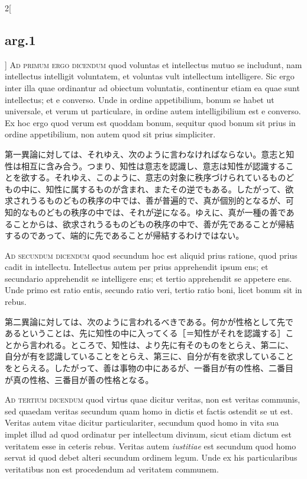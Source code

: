 \documentclass[paper=a4paper,fontsize=10pt,jafontsize=9pt,titlepage]{jlreq}
\begin{document}
\begin{paracol}{2}[\subsection{arg.1}]
{\scshape Ad primum ergo dicendum} quod voluntas et intellectus mutuo
se includunt, nam intellectus intelligit voluntatem, et voluntas vult
intellectum intelligere. Sic ergo inter illa quae ordinantur ad
obiectum voluntatis, continentur etiam ea quae sunt intellectus; et e
converso. Unde in ordine appetibilium, bonum se habet ut universale,
et verum ut particulare, in ordine autem intelligibilium est e
converso. Ex hoc ergo quod verum est quoddam bonum, sequitur quod
bonum sit prius in ordine appetibilium, non autem quod sit prius
simpliciter.

\switchcolumn

第一異論に対しては、それゆえ、次のように言わなければならない。意志と知
性は相互に含み合う。つまり、知性は意志を認識し、意志は知性が認識するこ
とを欲する。それゆえ、このように、意志の対象に秩序づけられているものど
もの中に、知性に属するものが含まれ、またその逆でもある。したがって、欲
求されうるものどもの秩序の中では、善が普遍的で、真が個別的となるが、可
知的なものどもの秩序の中では、それが逆になる。ゆえに、真が一種の善であ
ることからは、欲求されうるものどもの秩序の中で、善が先であることが帰結
するのであって、端的に先であることが帰結するわけではない。

\switchcolumn*[\subsection{ad.2}]


{\scshape Ad secundum dicendum} quod secundum hoc est aliquid prius
ratione, quod prius cadit in intellectu. Intellectus autem per prius
apprehendit ipsum ens; et secundario apprehendit se intelligere ens;
et tertio apprehendit se appetere ens. Unde primo est ratio entis,
secundo ratio veri, tertio ratio boni, licet bonum sit in rebus.

\switchcolumn

第二異論に対しては、次のように言われるべきである。何かが性格として先で
あるということは、先に知性の中に入ってくる［＝知性がそれを認識する］こ
とから言われる。ところで、知性は、より先に有そのものをとらえ、第二に、
自分が有を認識していることをとらえ、第三に、自分が有を欲求していること
をとらえる。したがって、善は事物の中にあるが、一番目が有の性格、二番目
が真の性格、三番目が善の性格となる。

\switchcolumn*[\subsection{ad.3}]


{\scshape Ad tertium dicendum} quod virtus quae dicitur veritas, non
est veritas communis, sed quaedam veritas secundum quam homo in dictis
et factis ostendit se ut est. Veritas autem vitae dicitur
particulariter, secundum quod homo in vita sua implet illud ad quod
ordinatur per intellectum divinum, sicut etiam dictum est veritatem
esse in ceteris rebus. Veritas autem {\itshape iustitiae} est secundum
quod homo servat id quod debet alteri secundum ordinem legum. Unde ex
his particularibus veritatibus non est procedendum ad veritatem
communem.


\end{paracol}
\end{document}
